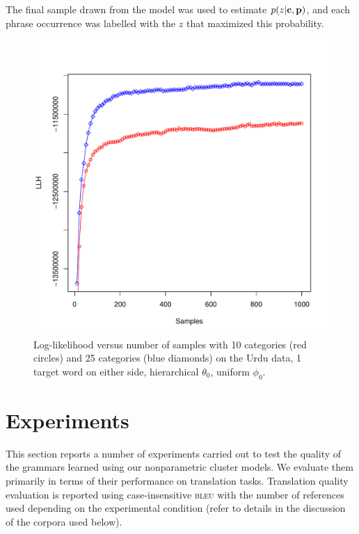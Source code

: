 The final sample drawn from the model was used to estimate $p(z|\textbf{c},\textbf{p})$, and each phrase occurrence was labelled with the $z$ that maximized this probability.

\begin{figure}
\begin{center}
\includegraphics[scale=0.5]{pyp_clustering/llh.pdf}
\vspace{-0.7cm}
\end{center}
\caption{Log-likelihood versus number of samples with 10 categories (red circles) and 25 categories (blue diamonds) on the Urdu data, 1 target word on either side, hierarchical $\theta_0$, uniform $\phi_0$.}
\label{fig:llh}
\end{figure}

\section{Experiments}

This section reports a number of experiments carried out to test the quality of the grammars learned using our nonparametric cluster models.  We evaluate them primarily in terms of their performance on translation tasks.  Translation quality evaluation is reported using case-insensitive \textsc{bleu} \citep{bleu} with the number of references used depending on the experimental condition (refer to details in the discussion of the corpora used below).

